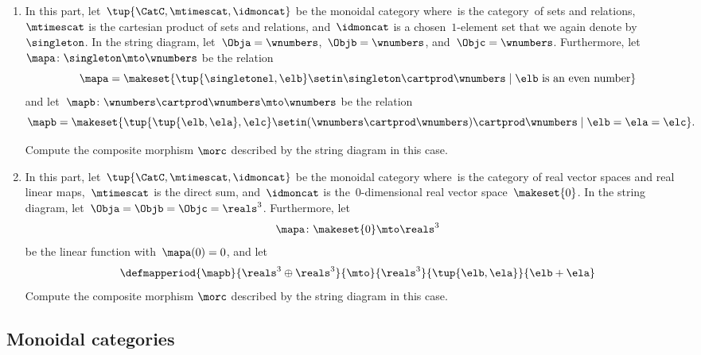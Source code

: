 \begin{gradedexercise}
\begin{enumerate}
        \item In this part, let~$\tup{\CatC,\mtimescat,\idmoncat}$ be the monoidal category where~\CatC is the category~\Rel of sets and relations,~$\mtimescat$ is the cartesian product of sets and relations, and~$\idmoncat$ is a chosen~$1$-element set that we again denote by~$\singleton$.
              In the string diagram, let~$\Obja = \wnumbers$,~$\Objb = \wnumbers$, and~$\Objc = \wnumbers$.
              Furthermore, let~$\mapa\colon \singleton \mto \wnumbers$ be the relation
              \begin{equation}
                  \mapa = \makeset{ \tup{\singletonel, \elb} \setin \singleton \cartprod \wnumbers \mid \elb \text{ is an even number}}
              \end{equation}
              and let~$\mapb \colon \wnumbers \cartprod \wnumbers \mto \wnumbers$ be the relation
              \begin{equation}
                  \mapb = \makeset{ \tup{\tup{\elb, \ela}, \elc} \setin (\wnumbers \cartprod \wnumbers) \cartprod \wnumbers \mid \elb = \ela = \elc}.
              \end{equation}

              Compute the composite morphism $\morc$ described by the string diagram in this case.

        \item In this part, let~$\tup{\CatC,\mtimescat,\idmoncat}$ be the monoidal category where~\CatC is the category of real vector spaces and real linear maps,~$\mtimescat$ is the direct sum, and~$\idmoncat$ is the~$0$-dimensional real vector space~$\makeset{0}$.
              In the string diagram, let~$\Obja = \Objb = \Objc = \reals^3$.
              Furthermore, let
              \begin{equation}
                  \mapa\colon \makeset{0} \mto \reals^3
              \end{equation}
              be the linear function with~$\mapa(0) = 0$, and let
              \begin{equation}
                  \defmapperiod{\mapb}{\reals^3\oplus \reals^3}{\mto}{\reals^3}{\tup{\elb,\ela}}{\elb+\ela}
              \end{equation}
              Compute the composite morphism $\morc$ described by the string diagram in this case.
    \end{enumerate}
\end{gradedexercise}

\subsection{Monoidal categories}

